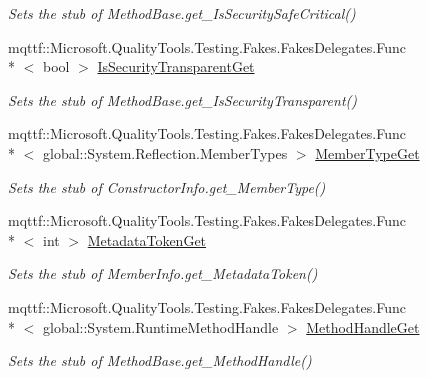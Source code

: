 \begin{DoxyCompactItemize}
\begin{DoxyCompactList}\small\item\em Sets the stub of Method\-Base.\-get\-\_\-\-Is\-Security\-Safe\-Critical()\end{DoxyCompactList}\item 
mqttf\-::\-Microsoft.\-Quality\-Tools.\-Testing.\-Fakes.\-Fakes\-Delegates.\-Func\\*
$<$ bool $>$ \hyperlink{class_system_1_1_reflection_1_1_fakes_1_1_stub_constructor_info_a6c824af40752c6bd59f9fbda7d65b9b1}{Is\-Security\-Transparent\-Get}
\begin{DoxyCompactList}\small\item\em Sets the stub of Method\-Base.\-get\-\_\-\-Is\-Security\-Transparent()\end{DoxyCompactList}\item 
mqttf\-::\-Microsoft.\-Quality\-Tools.\-Testing.\-Fakes.\-Fakes\-Delegates.\-Func\\*
$<$ global\-::\-System.\-Reflection.\-Member\-Types $>$ \hyperlink{class_system_1_1_reflection_1_1_fakes_1_1_stub_constructor_info_a13b1c48ac3ca697c1ad8ce6bd31a6888}{Member\-Type\-Get}
\begin{DoxyCompactList}\small\item\em Sets the stub of Constructor\-Info.\-get\-\_\-\-Member\-Type()\end{DoxyCompactList}\item 
mqttf\-::\-Microsoft.\-Quality\-Tools.\-Testing.\-Fakes.\-Fakes\-Delegates.\-Func\\*
$<$ int $>$ \hyperlink{class_system_1_1_reflection_1_1_fakes_1_1_stub_constructor_info_a0d48672f2b03f1359e730dd1795f0247}{Metadata\-Token\-Get}
\begin{DoxyCompactList}\small\item\em Sets the stub of Member\-Info.\-get\-\_\-\-Metadata\-Token()\end{DoxyCompactList}\item 
mqttf\-::\-Microsoft.\-Quality\-Tools.\-Testing.\-Fakes.\-Fakes\-Delegates.\-Func\\*
$<$ global\-::\-System.\-Runtime\-Method\-Handle $>$ \hyperlink{class_system_1_1_reflection_1_1_fakes_1_1_stub_constructor_info_ad385756d8c89b4f825d97a1f7492ef82}{Method\-Handle\-Get}
\begin{DoxyCompactList}\small\item\em Sets the stub of Method\-Base.\-get\-\_\-\-Method\-Handle()\end{DoxyCompactList}\item 

\end{DoxyCompactItemize}
